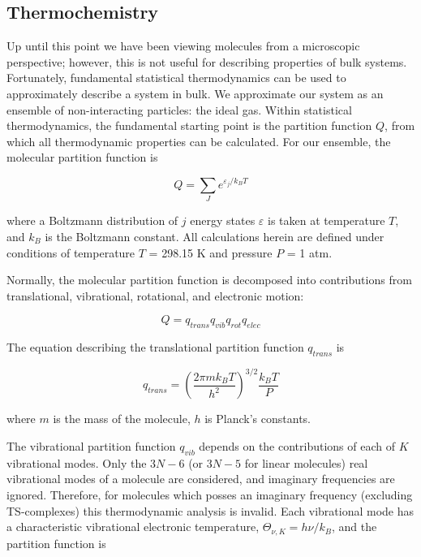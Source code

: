 \subsection{Thermochemistry}

Up until this point we have been viewing molecules from a microscopic perspective; however, this is not useful for describing properties of bulk systems. Fortunately, fundamental statistical thermodynamics can be used to approximately describe a system in bulk.\cite{McQuarrie1999,McQuarrie2000} We approximate our system as an ensemble of non-interacting particles: the ideal gas. Within statistical thermodynamics, the fundamental starting point is the partition function $Q$,\cite{note4} from which all thermodynamic properties can be calculated. For our ensemble, the molecular partition function is

\begin{equation}
  Q = \sum_J e^{\varepsilon_j/k_BT}
\end{equation}

\noindent where a Boltzmann distribution of $j$ energy states $\varepsilon$ is taken at temperature $T$, and $k_B$ is the Boltzmann constant. All calculations herein are defined under conditions of temperature $T$ = 298.15 K and pressure $P$ = 1 atm.

Normally, the molecular partition function is decomposed into contributions from translational, vibrational, rotational, and electronic motion:

\begin{equation}
  Q = q_{trans}q_{vib}q_{rot}q_{elec}
\end{equation}

\noindent The equation describing the translational partition function
$q_{trans}$ is

\begin{equation}
  q_{trans} = \left( \frac{2\pi m k_B T}{h^2} \right)^{3/2} \frac{k_BT}{P}
\end{equation}

\noindent where $m$ is the mass of the molecule, $h$ is Planck's constants.

The vibrational partition function $q_{vib}$ depends on the contributions of each of $K$ vibrational modes. Only the $3N-6$ (or $3N-5$ for linear molecules) real vibrational modes of a molecule are considered, and imaginary frequencies are ignored. Therefore, for molecules which posses an imaginary frequency (excluding TS-complexes) this thermodynamic analysis is invalid. Each vibrational mode has a characteristic vibrational electronic temperature, $\Theta_{\nu,K} = h\nu/k_B$, and the partition function is

